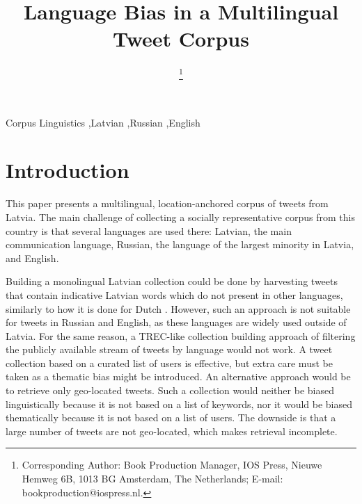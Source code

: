 \documentclass{IOS-Book-Article}
\begin{document}
\begin{frontmatter}              %

\title{Language Bias in a Multilingual Tweet Corpus}

\author[A]{ %
\thanks{Corresponding Author: Book Production Manager, IOS Press, Nieuwe Hemweg 6B,
1013 BG Amsterdam, The Netherlands; E-mail:
bookproduction@iospress.nl.}}


\address[A]{Confidential Review Copy, Do Not Distribute}

%

\begin{keyword}
Corpus Linguistics \sep Latvian \sep Russian \sep English
\end{keyword}
\end{frontmatter}

\thispagestyle{empty}
\pagestyle{empty}

\section*{Introduction}

This paper presents a multilingual, location-anchored corpus of tweets from Latvia. The main challenge of collecting a socially representative corpus from this country is that several languages are used there: Latvian, the main communication language, Russian, the language of the largest minority in Latvia, and English.

%
Building a monolingual Latvian collection could be done by harvesting tweets that contain indicative Latvian words which do not present in other languages, similarly to how it is done for Dutch \cite{sang2013}. However, such an approach is not suitable for tweets in Russian and English, as these languages are widely used outside of Latvia.
%
For the same reason, a TREC-like collection building approach \cite{lin2016overview} of filtering the publicly available stream of tweets by language would not work.
%
A tweet collection based on a curated list of users \cite{SANVICENTE16.465} is effective, but extra care must be taken as a thematic bias might be introduced.
%
%
An alternative approach would be to retrieve only geo-located tweets. Such a collection would neither be biased linguistically because it is not based on a list of keywords, nor it would be biased thematically because it is not based on a list of users. The downside is that a large number of tweets are not geo-located, which makes retrieval incomplete.
\end{document}
